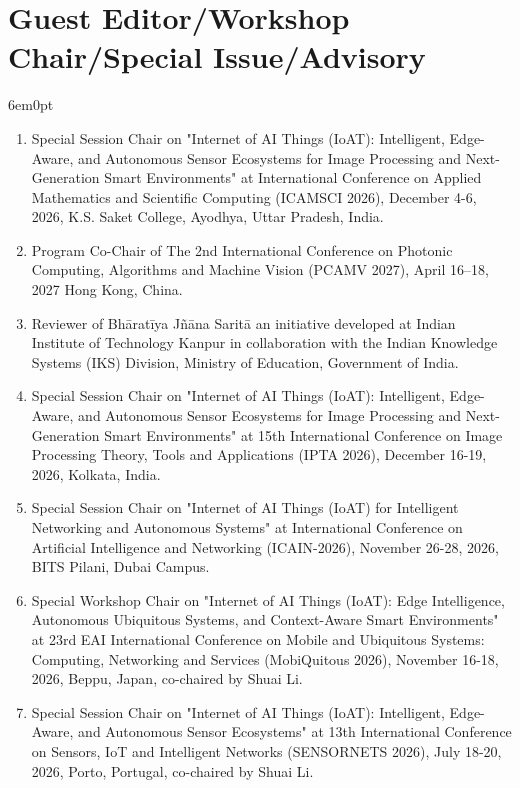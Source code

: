 \documentclass[11pt,a4paper]{moderncv}
\begin{document}
\section{\textbf{Guest Editor/Workshop Chair/Special Issue/Advisory}}

\begin{adjustwidth}{6em}{0pt}
	\begin{enumerate}
		
		
		\item Special Session Chair on "Internet of AI Things (IoAT): Intelligent, Edge-Aware, and Autonomous Sensor Ecosystems for Image Processing and Next-Generation Smart Environments" at International Conference on Applied Mathematics and Scientific Computing (ICAMSCI 2026), December 4-6, 2026, K.S. Saket College, Ayodhya, Uttar Pradesh, India.
				
		\item Program Co-Chair of The 2nd International Conference on Photonic Computing, Algorithms and Machine Vision (PCAMV 2027), April 16–18, 2027 Hong Kong, China.

		\item Reviewer of Bhāratīya Jñāna Saritā an initiative developed at Indian Institute of Technology Kanpur in collaboration with the Indian Knowledge Systems (IKS) Division, Ministry of Education, Government of India.
		
		\item Special Session Chair on "Internet of AI Things (IoAT): Intelligent, Edge-Aware, and Autonomous Sensor Ecosystems for Image Processing and Next-Generation Smart Environments" at 15th International Conference on Image Processing Theory, Tools and Applications (IPTA 2026), December 16-19, 2026, Kolkata, India.


		\item Special Session Chair on "Internet of AI Things (IoAT) for Intelligent Networking and Autonomous Systems" at International Conference on Artificial Intelligence and Networking (ICAIN-2026), November 26-28, 2026, BITS Pilani, Dubai Campus.
		

		\item Special Workshop Chair on "Internet of AI Things (IoAT): Edge Intelligence, Autonomous Ubiquitous Systems, and Context-Aware Smart Environments" at 23rd EAI International Conference on Mobile and Ubiquitous Systems: Computing, Networking and Services (MobiQuitous 2026), November 16-18, 2026, Beppu, Japan, co-chaired by Shuai Li.
		
		\item Special Session Chair on "Internet of AI Things (IoAT): Intelligent, Edge-Aware, and Autonomous Sensor Ecosystems" at 13th International Conference on Sensors, IoT and Intelligent Networks (SENSORNETS 2026), July 18-20, 2026, Porto, Portugal, co-chaired by Shuai Li.
				

\end{enumerate}
\end{adjustwidth}
\end{document}
